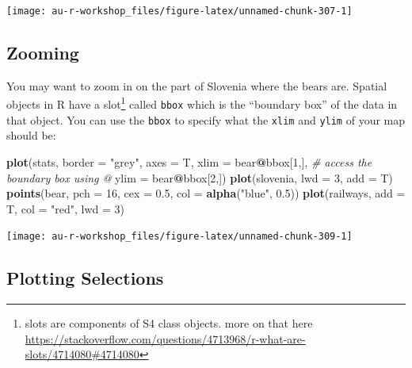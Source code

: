 \documentclass[]{book}
\newenvironment{Shaded}{\begin{snugshade}}{\end{snugshade}}
\newcommand{\CommentTok}[1]{\textcolor[rgb]{0.56,0.35,0.01}{\textit{#1}}}
\newcommand{\DataTypeTok}[1]{\textcolor[rgb]{0.13,0.29,0.53}{#1}}
\newcommand{\DecValTok}[1]{\textcolor[rgb]{0.00,0.00,0.81}{#1}}
\newcommand{\FloatTok}[1]{\textcolor[rgb]{0.00,0.00,0.81}{#1}}
\newcommand{\KeywordTok}[1]{\textcolor[rgb]{0.13,0.29,0.53}{\textbf{#1}}}
\newcommand{\NormalTok}[1]{#1}
\newcommand{\OperatorTok}[1]{\textcolor[rgb]{0.81,0.36,0.00}{\textbf{#1}}}
\newcommand{\StringTok}[1]{\textcolor[rgb]{0.31,0.60,0.02}{#1}}
\let\rmarkdownfootnote\footnote%
\def\footnote{\protect\rmarkdownfootnote}
\begin{document}
\begin{center}\texttt{[image: au-r-workshop\_files/figure-latex/unnamed-chunk-307-1]} \end{center}

\hypertarget{zoom}{%
\subsection{Zooming}\label{zoom}}

You may want to zoom in on the part of Slovenia where the bears are. Spatial objects in R have a slot\footnote{slots are components of S4 class objects. more on that here \url{https://stackoverflow.com/questions/4713968/r-what-are-slots/4714080\#4714080}} called \texttt{bbox} which is the ``boundary box'' of the data in that object. You can use the \texttt{bbox} to specify what the \texttt{xlim} and \texttt{ylim} of your map should be:

\begin{Shaded}
\begin{Highlighting}[]
\KeywordTok{plot}\NormalTok{(stats, }\DataTypeTok{border =} \StringTok{"grey"}\NormalTok{, }\DataTypeTok{axes =}\NormalTok{ T,}
     \DataTypeTok{xlim =}\NormalTok{ bear}\OperatorTok{@}\NormalTok{bbox[}\DecValTok{1}\NormalTok{,],  }\CommentTok{# access the boundary box using @}
     \DataTypeTok{ylim =}\NormalTok{ bear}\OperatorTok{@}\NormalTok{bbox[}\DecValTok{2}\NormalTok{,])}
\KeywordTok{plot}\NormalTok{(slovenia, }\DataTypeTok{lwd =} \DecValTok{3}\NormalTok{, }\DataTypeTok{add =}\NormalTok{ T)}
\KeywordTok{points}\NormalTok{(bear, }\DataTypeTok{pch =} \DecValTok{16}\NormalTok{, }\DataTypeTok{cex =} \FloatTok{0.5}\NormalTok{, }\DataTypeTok{col =} \KeywordTok{alpha}\NormalTok{(}\StringTok{"blue"}\NormalTok{, }\FloatTok{0.5}\NormalTok{))}
\KeywordTok{plot}\NormalTok{(railways, }\DataTypeTok{add =}\NormalTok{ T, }\DataTypeTok{col =} \StringTok{"red"}\NormalTok{, }\DataTypeTok{lwd =} \DecValTok{3}\NormalTok{)}
\end{Highlighting}
\end{Shaded}

\begin{center}\texttt{[image: au-r-workshop\_files/figure-latex/unnamed-chunk-309-1]} \end{center}

\hypertarget{plot-selections}{%
\subsection{Plotting Selections}\label{plot-selections}}
\end{document}
